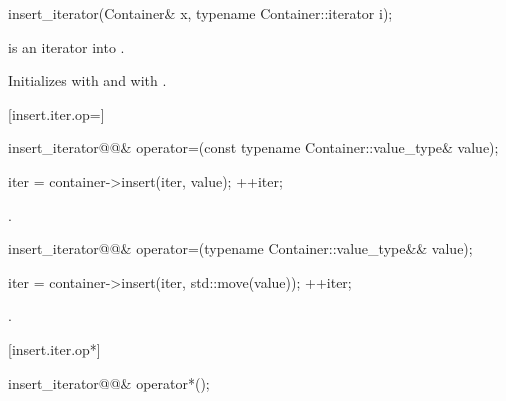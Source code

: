 %

\begin{itemdecl}
insert_iterator(Container& x, typename Container::iterator i);
\end{itemdecl}

\begin{itemdescr}
\begin{addedblock}
\pnum
\requires
{} is an iterator into .
\end{addedblock}

\pnum
\effects
Initializes
with  and
with .
\end{itemdescr}

[insert.iter.op=]{}

%
\begin{itemdecl}
insert_iterator@@&
  operator=(const typename Container::value_type& value);
\end{itemdecl}

\begin{itemdescr}
\pnum
\effects {}
\begin{codeblock}
iter = container->insert(iter, value);
++iter;
\end{codeblock}

\pnum
\returns
{}.
\end{itemdescr}

%
\begin{itemdecl}
insert_iterator@@&
  operator=(typename Container::value_type&& value);
\end{itemdecl}

\begin{itemdescr}
\pnum
\effects {}
\begin{codeblock}
iter = container->insert(iter, std::move(value));
++iter;
\end{codeblock}

\pnum
\returns
{}.
\end{itemdescr}

[insert.iter.op*]{}

%
\begin{itemdecl}
insert_iterator@@& operator*();
\end{itemdecl}

